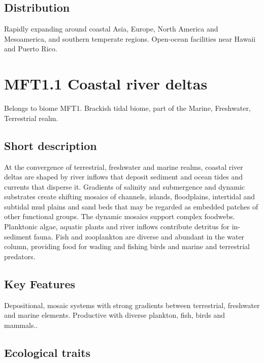 \documentclass[
  letterpaper,
  DIV=11,
  numbers=noendperiod]{scrartcl}
\begin{document}
\subsection{Distribution}\label{distribution-48}

Rapidly expanding around coastal Asia, Europe, North America and
Mesoamerica, and southern temperate regions. Open-ocean facilities near
Hawaii and Puerto Rico.

\section{MFT1.1 Coastal river deltas}\label{mft1.1-coastal-river-deltas}

Belongs to biome MFT1. Brackish tidal biome, part of the Marine,
Freshwater, Terrestrial realm.

\subsection{Short description}\label{short-description-49}

At the convergence of terrestrial, freshwater and marine realms, coastal
river deltas are shaped by river inflows that deposit sediment and ocean
tides and currents that disperse it. Gradients of salinity and
submergence and dynamic substrates create shifting mosaics of channels,
islands, floodplains, intertidal and subtidal mud plains and sand beds
that may be regarded as embedded patches of other functional groups. The
dynamic mosaics support complex foodwebs. Planktonic algae, aquatic
plants and river inflows contribute detritus for in-sediment fauna. Fish
and zooplankton are diverse and abundant in the water column, providing
food for wading and fishing birds and marine and terrestrial predators.

\subsection{Key Features}\label{key-features-49}

Depositional, mosaic systems with strong gradients between terrestrial,
freshwater and marine elements. Productive with diverse plankton, fish,
birds and mammals..

\subsection{Ecological traits}\label{ecological-traits-49}
\end{document}
